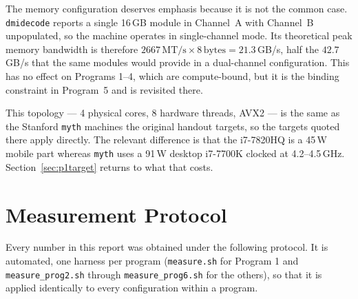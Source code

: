 \documentclass[11pt,a4paper]{article}
\begin{document}
The memory configuration deserves emphasis because it is not the common case.
\texttt{dmidecode} reports a single 16\,GB module in Channel~A with Channel~B
unpopulated, so the machine operates in single-channel mode. Its theoretical
peak memory bandwidth is therefore $2667\,\text{MT/s} \times 8\,\text{bytes}
= 21.3$\,GB/s, half the $42.7$\,GB/s that the same modules would provide in a
dual-channel configuration. This has no effect on Programs 1--4, which are
compute-bound, but it is the binding constraint in Program~5 and is revisited
there.

This topology --- 4 physical cores, 8 hardware threads, AVX2 --- is the same
as the Stanford \texttt{myth} machines the original handout targets, so the
targets quoted there apply directly. The relevant difference is that the
i7-7820HQ is a 45\,W mobile part whereas \texttt{myth} uses a 91\,W desktop
i7-7700K clocked at 4.2--4.5\,GHz. Section~\ref{sec:p1target} returns to what
that costs.

\section{Measurement Protocol}
\label{sec:protocol}

Every number in this report was obtained under the following protocol. It is
automated, one harness per program (\texttt{measure.sh} for Program 1 and
\texttt{measure\_prog2.sh} through \texttt{measure\_prog6.sh} for the
others), so that it is applied identically to every configuration within a
program.
\end{document}
